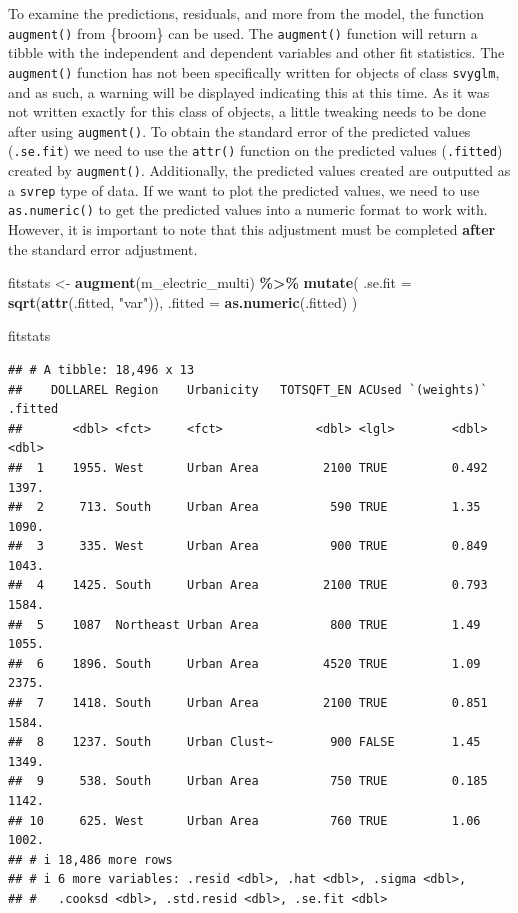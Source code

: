 \documentclass[
]{krantz}
\makeatletter
\newenvironment{Shaded}{\begin{snugshade}}{\end{snugshade}}
\newcommand{\AttributeTok}[1]{\textcolor[rgb]{0.27,0.27,0.27}{#1}}
\newcommand{\FunctionTok}[1]{\textcolor[rgb]{0.27,0.27,0.27}{\textbf{#1}}}
\newcommand{\NormalTok}[1]{#1}
\newcommand{\OtherTok}[1]{\textcolor[rgb]{0.37,0.37,0.37}{#1}}
\newcommand{\SpecialCharTok}[1]{\textcolor[rgb]{0.43,0.43,0.43}{\textbf{#1}}}
\newcommand{\StringTok}[1]{\textcolor[rgb]{0.5,0.5,0.5}{#1}}
\newenvironment{kframe}{%
\medskip{}
\setlength{\fboxsep}{.8em}
 \def\at@end@of@kframe{}%
 \ifinner\ifhmode%
  \def\at@end@of@kframe{\end{minipage}}%
  \begin{minipage}{\columnwidth}%
 \fi\fi%
 \def\FrameCommand##1{\hskip\@totalleftmargin \hskip-\fboxsep
 \colorbox{shadecolor}{##1}\hskip-\fboxsep
     \hskip-\linewidth \hskip-\@totalleftmargin \hskip\columnwidth}%
 \MakeFramed {\advance\hsize-\width
   \@totalleftmargin\z@ \linewidth\hsize
   \@setminipage}}%
 {\par\unskip\endMakeFramed%
 \at@end@of@kframe}
\renewenvironment{Shaded}{\begin{kframe}}{\end{kframe}}
\makeatother
\begin{document}
To examine the predictions, residuals, and more from the model, the function \texttt{augment()} from \{broom\} can be used. The \texttt{augment()} function will return a tibble with the independent and dependent variables and other fit statistics. The \texttt{augment()} function has not been specifically written for objects of class \texttt{svyglm}, and as such, a warning will be displayed indicating this at this time. As it was not written exactly for this class of objects, a little tweaking needs to be done after using \texttt{augment()}. To obtain the standard error of the predicted values (\texttt{.se.fit}) we need to use the \texttt{attr()} function on the predicted values (\texttt{.fitted}) created by \texttt{augment()}. Additionally, the predicted values created are outputted as a \texttt{svrep} type of data. If we want to plot the predicted values, we need to use \texttt{as.numeric()} to get the predicted values into a numeric format to work with. However, it is important to note that this adjustment must be completed \textbf{after} the standard error adjustment.

\begin{Shaded}
\begin{Highlighting}[]
\NormalTok{fitstats }\OtherTok{\textless{}{-}}
  \FunctionTok{augment}\NormalTok{(m\_electric\_multi) }\SpecialCharTok{\%\textgreater{}\%}
  \FunctionTok{mutate}\NormalTok{(}
    \AttributeTok{.se.fit =} \FunctionTok{sqrt}\NormalTok{(}\FunctionTok{attr}\NormalTok{(.fitted, }\StringTok{"var"}\NormalTok{)),}
    \AttributeTok{.fitted =} \FunctionTok{as.numeric}\NormalTok{(.fitted)}
\NormalTok{  )}

\NormalTok{fitstats}
\end{Highlighting}
\end{Shaded}

\begin{verbatim}
## # A tibble: 18,496 x 13
##    DOLLAREL Region    Urbanicity   TOTSQFT_EN ACUsed `(weights)` .fitted
##       <dbl> <fct>     <fct>             <dbl> <lgl>        <dbl>   <dbl>
##  1    1955. West      Urban Area         2100 TRUE         0.492   1397.
##  2     713. South     Urban Area          590 TRUE         1.35    1090.
##  3     335. West      Urban Area          900 TRUE         0.849   1043.
##  4    1425. South     Urban Area         2100 TRUE         0.793   1584.
##  5    1087  Northeast Urban Area          800 TRUE         1.49    1055.
##  6    1896. South     Urban Area         4520 TRUE         1.09    2375.
##  7    1418. South     Urban Area         2100 TRUE         0.851   1584.
##  8    1237. South     Urban Clust~        900 FALSE        1.45    1349.
##  9     538. South     Urban Area          750 TRUE         0.185   1142.
## 10     625. West      Urban Area          760 TRUE         1.06    1002.
## # i 18,486 more rows
## # i 6 more variables: .resid <dbl>, .hat <dbl>, .sigma <dbl>,
## #   .cooksd <dbl>, .std.resid <dbl>, .se.fit <dbl>
\end{verbatim}
\end{document}
